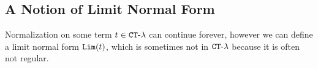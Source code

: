 %
%
%
%
%
%
%
%


\subsection{A Notion of Limit Normal Form}
Normalization on some term $t \in { {\tt CT}\mbox{-}\lambda}$ can continue forever,
however we can define a limit normal form ${\tt Lim}(t)$, which is sometimes
not in ${ {\tt CT}\mbox{-}\lambda}$ because it is often not regular. 

